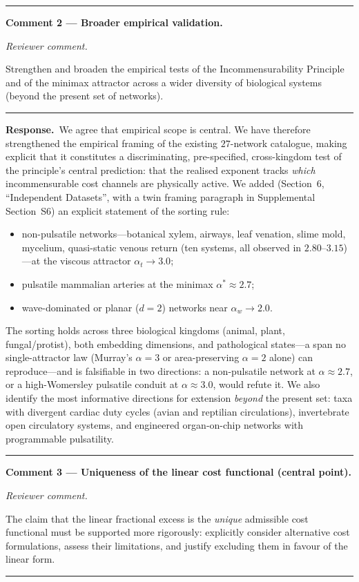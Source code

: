 \documentclass[11pt]{article}
\newenvironment{comment}%
  {\par\medskip\noindent\itshape\color{black!75} Reviewer comment.\par\nobreak}%
  {\par\nobreak\noindent\rule{\linewidth}{0.4pt}\medskip}
\newcommand{\response}{\par\medskip\noindent\textbf{Response.}\ }
\begin{document}
\bigskip
\hrule
\bigskip
\noindent\textbf{Comment 2 --- Broader empirical validation.}
\begin{comment}
Strengthen and broaden the empirical tests of the Incommensurability Principle
and of the minimax attractor across a wider diversity of biological systems
(beyond the present set of networks).
\end{comment}

\response We agree that empirical scope is central. We have therefore
strengthened the empirical framing of the existing $27$-network catalogue,
making explicit that it constitutes a discriminating, pre-specified,
cross-kingdom test of the principle's central prediction: that the realised
exponent tracks \emph{which} incommensurable cost channels are physically
active. We added (Section~6, ``Independent Datasets'', with a twin framing
paragraph in
Supplemental Section~S6) an explicit statement of the sorting rule:
\begin{itemize}[leftmargin=1.4em,itemsep=2pt,topsep=2pt]
  \item non-pulsatile networks---botanical xylem, airways, leaf venation, slime
        mold, mycelium, quasi-static venous return (ten systems, all observed in
        $2.80$--$3.15$)---at the viscous attractor $\alpha_t\to 3.0$;
  \item pulsatile mammalian arteries at the minimax $\alpha^*\approx 2.7$;
  \item wave-dominated or planar ($d=2$) networks near $\alpha_w\to 2.0$.
\end{itemize}
The sorting holds across three biological kingdoms (animal, plant,
fungal/protist), both embedding dimensions, and pathological states---a span no
single-attractor law (Murray's $\alpha=3$ or area-preserving $\alpha=2$ alone)
can reproduce---and is falsifiable in two directions: a non-pulsatile network at
$\alpha\approx 2.7$, or a high-Womersley pulsatile conduit at $\alpha\approx
3.0$, would refute it. We also identify the most informative directions for
extension \emph{beyond} the present set: taxa with divergent cardiac duty cycles
(avian and reptilian circulations), invertebrate open circulatory systems, and
engineered organ-on-chip networks with programmable pulsatility.

\bigskip
\hrule
\bigskip
\noindent\textbf{Comment 3 --- Uniqueness of the linear cost functional
(central point).}
\begin{comment}
The claim that the linear fractional excess is the \emph{unique} admissible cost
functional must be supported more rigorously: explicitly consider alternative
cost formulations, assess their limitations, and justify excluding them in
favour of the linear form.
\end{comment}
\end{document}
